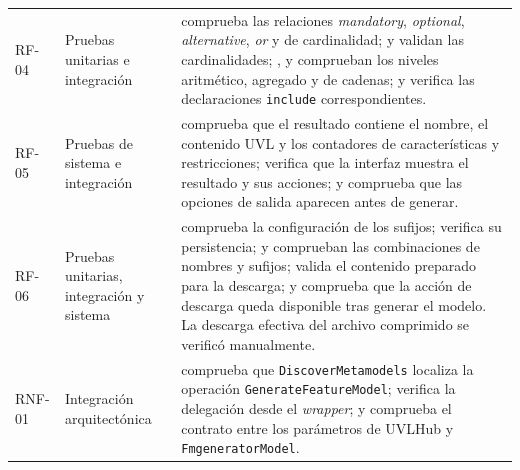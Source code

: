 \begin{longtable}{@{}P{1.3cm} P{2.6cm} P{\dimexpr\textwidth-3.9cm-4\tabcolsep\relax}@{}}
RF-04 &
Pruebas unitarias e integración &
comprueba las relaciones \textit{mandatory}, \textit{optional},
\textit{alternative}, \textit{or} y de cardinalidad;
y
validan las cardinalidades;
,
y
comprueban los niveles aritmético, agregado y de cadenas; y
verifica las declaraciones \texttt{include} correspondientes.
\\[0.9em]

RF-05 &
Pruebas de sistema e integración &
comprueba que el resultado contiene el nombre, el contenido UVL y los
contadores de características y restricciones;
verifica que la interfaz muestra el resultado y sus acciones; y
comprueba que las opciones de salida aparecen antes de generar.
\\[0.9em]

RF-06 &
Pruebas unitarias, integración y sistema &
comprueba la configuración de los sufijos;
verifica su persistencia;
y
comprueban las combinaciones de nombres y sufijos;
valida el contenido preparado para la descarga; y
comprueba que la acción de descarga queda disponible tras generar el modelo.
La descarga efectiva del archivo comprimido se verificó manualmente.
\\[0.9em]

\midrule

RNF-01 &
Integración arquitectónica &
comprueba que \texttt{DiscoverMetamodels} localiza la operación
\texttt{GenerateFeatureModel};
verifica la delegación desde el \textit{wrapper}; y
comprueba el contrato entre los parámetros de UVLHub y
\texttt{FmgeneratorModel}.
\\[0.9em]


\end{longtable}
